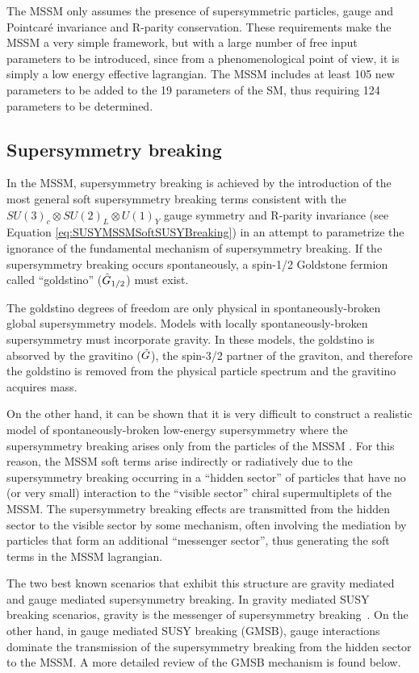 The MSSM only assumes the presence of supersymmetric particles, gauge and Pointcar\'{e} invariance and R-parity conservation.
These requirements make the MSSM a very simple framework, but with a large number of free input parameters to be introduced, since from a phenomenological point of view, it is simply a low energy effective lagrangian.
The MSSM includes at least 105 new parameters to be added to the 19 parameters of the SM, thus requiring 124 parameters to be determined.


\subsection{Supersymmetry breaking}

In the MSSM, supersymmetry breaking is achieved by the introduction of the most general soft supersymmetry breaking terms consistent with the $SU(3)_c\otimes SU(2)_L\otimes U(1)_Y$ gauge symmetry and R-parity invariance (see Equation \ref{eq:SUSYMSSMSoftSUSYBreaking}) in an attempt to parametrize the ignorance of the fundamental mechanism of supersymmetry breaking.
If the supersymmetry breaking occurs spontaneously, a spin-1/2 Goldstone fermion called ``goldstino'' ($\tilde{G}_{1/2}$) must exist.

The goldstino degrees of freedom are only physical in spontaneously-broken global supersymmetry models. 
Models with locally spontaneously-broken supersymmetry must incorporate gravity.
In these models, the goldstino is absorved by the gravitino ($\tilde{G}$), the spin-3/2 partner of the graviton, and therefore the goldstino is removed from the physical particle spectrum and the gravitino acquires mass.

On the other hand, it can be shown that it is very difficult to construct a realistic model of spontaneously-broken low-energy supersymmetry where the supersymmetry breaking arises only from the particles of the MSSM \cite{Martin:1997ns}.
For this reason, the MSSM soft terms arise indirectly or radiatively due to the supersymmetry breaking occurring in a ``hidden sector'' of particles that have no (or very small) interaction to the ``visible sector'' chiral supermultiplets of the MSSM.
The supersymmetry breaking effects are transmitted from the hidden sector to the visible sector by some mechanism, often involving the mediation by particles that form an additional ``messenger sector'', thus generating the soft terms in the MSSM lagrangian.

The two best known scenarios that exhibit this structure are gravity mediated and gauge mediated supersymmetry breaking.
In gravity mediated SUSY breaking scenarios, gravity is the messenger of supersymmetry breaking~\cite{Beringer:1900zz}.
On the other hand, in gauge mediated SUSY breaking (GMSB), gauge interactions dominate the transmission of the supersymmetry breaking from the hidden sector to the MSSM.
A more detailed review of the GMSB mechanism is found below.



